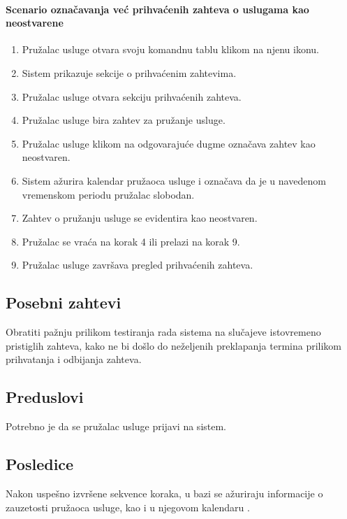 \documentclass[a4paper,12pt]{report}
\begin{document}
    \paragraph*{Scenario označavanja već prihvaćenih zahteva o uslugama kao neostvarene}
    \begin{enumerate}
        \item Pružalac usluge otvara svoju komandnu tablu klikom na njenu ikonu.
        \item Sistem prikazuje sekcije o prihvaćenim zahtevima.
        \item Pružalac usluge otvara sekciju prihvaćenih zahteva.
        \item Pružalac usluge bira zahtev za pružanje usluge.
        \item Pružalac usluge klikom na odgovarajuće dugme označava zahtev kao neostvaren.
        \item Sistem ažurira kalendar pružaoca usluge i označava da je u navedenom vremenskom periodu pružalac slobodan.
        \item Zahtev o pružanju usluge se evidentira kao neostvaren.
        \item Pružalac se vraća na korak 4 ili prelazi na korak 9.
        \item Pružalac usluge završava pregled prihvaćenih zahteva.
    \end{enumerate}
    
    
\subsection{Posebni zahtevi}
    Obratiti pažnju prilikom testiranja rada sistema na slučajeve istovremeno pristiglih zahteva, kako ne bi došlo do neželjenih preklapanja termina prilikom prihvatanja i odbijanja zahteva.
\subsection{Preduslovi}
    Potrebno je da se pružalac usluge prijavi na sistem. 
\subsection{Posledice}
    Nakon uspešno izvršene sekvence koraka, u bazi se ažuriraju informacije o zauzetosti pružaoca usluge, kao i u njegovom kalendaru .
\end{document}
